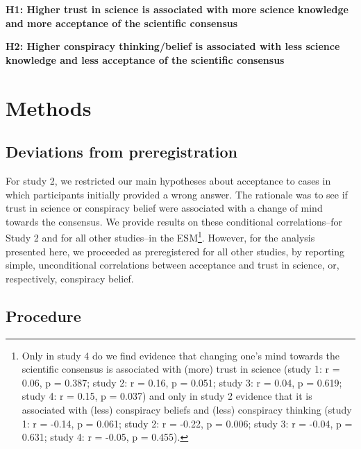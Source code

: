 \documentclass[
  doc,floatsintext]{apa6}
\begin{document}
\textbf{H1: Higher trust in science is associated with more science knowledge and more acceptance of the scientific consensus}

\textbf{H2: Higher conspiracy thinking/belief is associated with less science knowledge and less acceptance of the scientific consensus}

\section{Methods}\label{methods}

\subsection{Deviations from preregistration}\label{deviations-from-preregistration}

For study 2, we restricted our main hypotheses about acceptance to cases in which participants initially provided a wrong answer. The rationale was to see if trust in science or conspiracy belief were associated with a change of mind towards the consensus. We provide results on these conditional correlations--for Study 2 and for all other studies--in the ESM\footnote{Only in study 4 do we find evidence that changing one's mind towards the scientific consensus is associated with (more) trust in science (study 1: r = 0.06, p = 0.387; study 2: r = 0.16, p = 0.051; study 3: r = 0.04, p = 0.619; study 4: r = 0.15, p = 0.037) and only in study 2 evidence that it is associated with (less) conspiracy beliefs and (less) conspiracy thinking (study 1: r = -0.14, p = 0.061; study 2: r = -0.22, p = 0.006; study 3: r = -0.04, p = 0.631; study 4: r = -0.05, p = 0.455).}. However, for the analysis presented here, we proceeded as preregistered for all other studies, by reporting simple, unconditional correlations between acceptance and trust in science, or, respectively, conspiracy belief.

\subsection{Procedure}\label{procedure}
\end{document}
